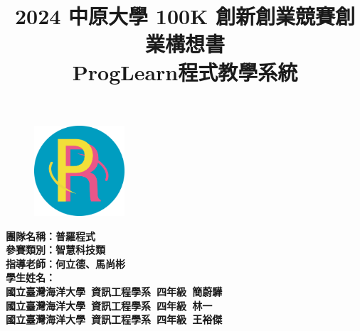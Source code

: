 \documentclass[12pt]{article}
\begin{document}
\title{2024 中原大學 100K 創新創業競賽創業構想書\\
  \vspace{0.5cm}
  \large ProgLearn程式教學系統}
\date{}

\maketitle %
\begin{figure}[H]
  \centering
  \includegraphics[width=0.3\textwidth]{images/LOGO.png}
\end{figure}
\begin{center}
  \vspace{12pt}
  \textbf{團隊名稱：普羅程式} \\
  \vspace{12pt}
  \textbf{參賽類別：智慧科技類} \\
  \vspace{12pt}
  \textbf{指導老師：何立德、馬尚彬} \\
  \vspace{12pt}
  \textbf{學生姓名：\\國立臺灣海洋大學\ 資訊工程學系\ 四年級\ 簡蔚驊\\國立臺灣海洋大學\ 資訊工程學系\ 四年級\ 林一\\國立臺灣海洋大學\ 資訊工程學系\ 四年級\ 王裕傑} \\
\end{center}
\thispagestyle{empty} %
\newpage


\thispagestyle{empty}
\newpage

\tableofcontents %
\thispagestyle{empty}
\newpage


\end{document}
